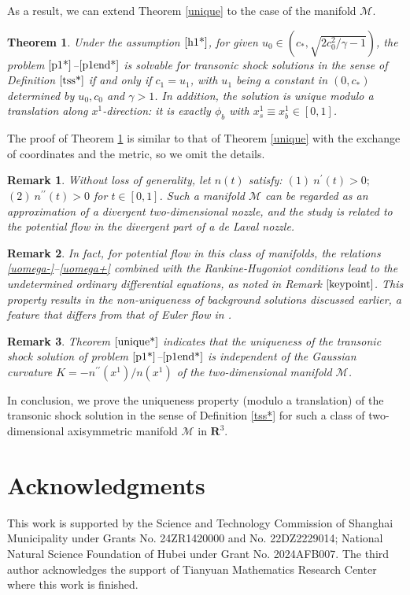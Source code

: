 \documentclass[reqno,12pt]{amsart}
\newtheorem{theorem}{Theorem}[section]
\newtheorem{remark}{Remark}[section]
\numberwithin{equation}{section}
\begin{document}
	As a result, we can extend Theorem \ref{unique} to the case of the manifold $\mathcal{M}$.
	
	\begin{theorem}\label{unique*}
	Under the assumption $\eqref{h1*}$, for given $u_0\in(c_*, \sqrt{2c_0^2/\gamma-1})$, the problem $\eqref{p1*}$--$\eqref{p1end*}$ is solvable for transonic shock solutions in the sense of Definition $\ref{tss*}$ if and only if $c_{1} = u_1$, with $u_1$ being a constant in
	$(0,c_*)$ determined by $u_0, c_0$ and $ \gamma >1$. In addition, the solution is unique modulo a translation along $x^1$-direction: it is exactly $\phi_b$ with $x^1_s\equiv x^1_b \in [0,1]$.
\end{theorem}
The proof of Theorem \ref{unique*} is similar to that of Theorem \ref{unique} with the exchange of coordinates and the metric, so we omit the details.
   \begin{remark}
		Without loss of generality, let $n(t)$ satisfy: $(1)~n^\prime(t)>0;$ $(2)~n^{\prime\prime}(t)>0$ for $t\in[0,1]$.  Such a manifold $\mathcal{M}$ can be regarded as an approximation of a divergent two-dimensional nozzle, and the study is related to the potential flow in the divergent part of a de Laval nozzle.
    \end{remark}
    \begin{remark}
        In fact, for potential flow in this class of manifolds, the relations \eqref{uomega-}--\eqref{uomega+} combined with the Rankine-Hugoniot conditions lead to the undetermined ordinary differential equations, as noted in Remark $\ref{keypoint}$. This property results in the non-uniqueness of background solutions discussed earlier, a feature that differs from that of Euler flow in \cite{backremarkY}.
    \end{remark}
    \begin{remark}
        Theorem $\ref{unique*}$ indicates that the uniqueness of the transonic shock solution of problem $\eqref{p1*}$--$\eqref{p1end*}$ is independent of the Gaussian curvature $K=-n^{\prime\prime}(x^1)/n(x^1)$ of the two-dimensional manifold $\mathcal{M}$. 
    \end{remark}
    
	In conclusion, we prove the uniqueness property (modulo a translation) of the transonic shock solution in the sense of Definition \ref{tss*} for such a class of two-dimensional axisymmetric manifold $\mathcal{M}$ in $\mathbf{R}^3$.

\section*{Acknowledgments}
This work is supported by the Science and Technology Commission of Shanghai Municipality under Grants No. 24ZR1420000 and No. 22DZ2229014; National Natural Science Foundation of Hubei under Grant No. 2024AFB007. The third author acknowledges the support of Tianyuan Mathematics Research Center where this work is finished.  
\end{document}
